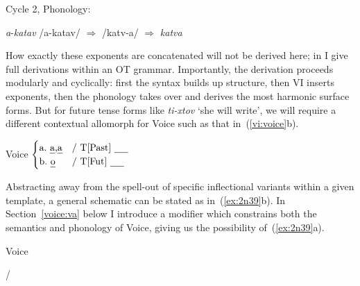 \begin{exe}
\begin{xlist}
\begin{exe}
\begin{xlist}
\begin{exe}
\begin{xlist}
\begin{exe}
\begin{exe}
\begin{xlist}
\begin{exe}
\begin{xlist}
\begin{exe}
\begin{xlist}
\begin{exe}
\begin{xlist}
\begin{exe}
\begin{xlist}
\begin{exe}
\begin{xlist}
\begin{exe}
\begin{xlist}
\begin{exe}
\begin{xlist}
\begin{exe}
\begin{xlist}
\begin{exe}
\begin{xlist}
\begin{exe}
\begin{xlist}
\begin{exe}
\begin{xlist}
\begin{exe}
\begin{xlist}
\begin{exe}
\begin{exe}
\begin{xlist}
\begin{exe}
\begin{xlist}
\begin{exe}
\begin{xlist}
\begin{exe}
\begin{xlist}
\begin{exe}
\begin{xlist}
\begin{exe}
\begin{xlist}
\begin{exe}
\begin{xlist}
\begin{exe}
\begin{xlist}
\begin{xlist}
\begin{xlist}
\begin{exe}
\begin{xlist}
\begin{xlist}
 \ex  Cycle 2, Phonology: 
 \begin{xlist} 
 	\ex   \emph{a}-\emph{katav} 
 	\ex   /a-katav/ $\Rightarrow$ /katv-a/ $\Rightarrow$ \emph{katva} 
 \z
\z 

How exactly these exponents are concatenated will not be derived here; in \cite{kastner18nllt} I give full derivations within an OT grammar. Importantly, the derivation proceeds modularly and cyclically: first the syntax builds up structure, then VI inserts exponents, then the phonology takes over and derives the most harmonic surface forms. But for future tense forms like \emph{ti-xtov} `she will write', we will require a different contextual allomorph for Voice such as that in~(\ref{vi:voice}b).
 \begin{exe}
\ex  \label{vi:voice} Voice \lra $\begin{cases} 
		\text{a.~\emph{a},\emph{a}} & \text{/ T[Past] \trace}\\
		\text{b.~\emph{o}} & \text{/ T[Fut] \trace}\\
		\end{cases}$
 \z 

Abstracting away from the spell-out of specific inflectional variants within a given template, a general schematic can be stated as in~(\ref{ex:2n39}b). In Section~\ref{voice:va} below I introduce a modifier which constrains both the semantics and phonology of Voice, giving us the possibility of~(\ref{ex:2n39}a).
 \begin{exe}
 \ex  \label{ex:2n39}Voice {\lra} 
 \begin{xlist} 
 	\ex   {\tpie} / {\trace} {\va} 
 	\ex   {\tkal} 
 \z
\z 


\end{xlist}
\end{exe}
\end{exe}
\end{xlist}
\end{xlist}
\end{xlist}
\end{exe}
\end{xlist}
\end{xlist}
\end{xlist}
\end{exe}
\end{xlist}
\end{exe}
\end{xlist}
\end{exe}
\end{xlist}
\end{exe}
\end{xlist}
\end{exe}
\end{xlist}
\end{exe}
\end{xlist}
\end{exe}
\end{xlist}
\end{exe}
\end{exe}
\end{xlist}
\end{exe}
\end{xlist}
\end{exe}
\end{xlist}
\end{exe}
\end{xlist}
\end{exe}
\end{xlist}
\end{exe}
\end{xlist}
\end{exe}
\end{xlist}
\end{exe}
\end{xlist}
\end{exe}
\end{xlist}
\end{exe}
\end{xlist}
\end{exe}
\end{xlist}
\end{exe}
\end{xlist}
\end{exe}
\end{xlist}
\end{exe}
\end{exe}
\end{xlist}
\end{exe}
\end{xlist}
\end{exe}
\end{xlist}
\end{exe}
